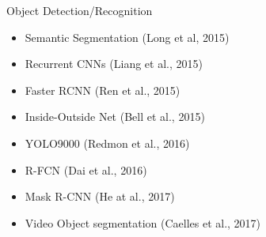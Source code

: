 \begin{frame}
\begin{columns}
        \begin{column}{0.5\textwidth}
            \begin{overlayarea}{\textwidth}{\textheight}
                \vspace{-5mm}
                \begin{block}{Object Detection/Recognition}
                    \begin{itemize}
                      \item Semantic Segmentation (Long et al, 2015) \cite{DBLP:conf/cvpr/LongSD15}
                      \item Recurrent CNNs (Liang et al., 2015) \cite{DBLP:conf/cvpr/LiangH15}
                      \item Faster RCNN (Ren et al., 2015) \cite{DBLP:journals/pami/RenHG017}
                      \item Inside-Outside Net (Bell et al., 2015) \cite{DBLP:journals/corr/BellZBG15}
                      \item YOLO9000 (Redmon et al., 2016) \cite{DBLP:journals/corr/RedmonF16}
                      \item R-FCN (Dai et al., 2016) \cite{DBLP:conf/nips/DaiLHS16}
                      \item Mask R-CNN (He at al., 2017) \cite{DBLP:conf/iccv/HeGDG17}
                      \item Video Object segmentation (Caelles et al., 2017) \cite{DBLP:conf/cvpr/CaellesMPLCG17}
                    \end{itemize}
                \end{block}
            \end{overlayarea}
        \end{column}
    \end{columns}
\end{frame}



